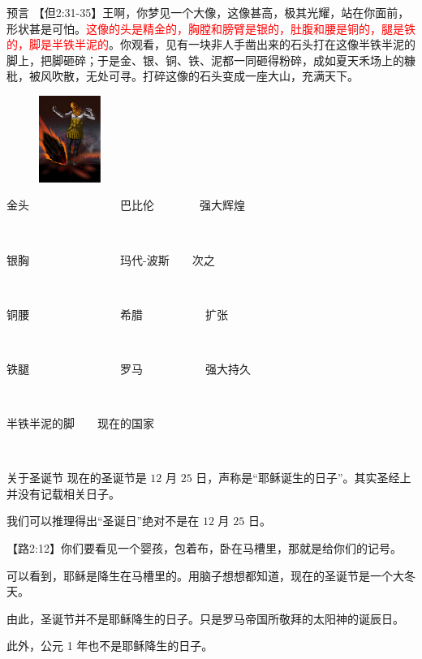 \documentclass[UTF8]{ctexbeamer}
\begin{document}
	\begin{frame}{预言}
		【但2:31-35】王啊，你梦见一个大像，这像甚高，极其光耀，站在你面前，形状甚是可怕。\textcolor{red}{这像的头是精金的，胸膛和膀臂是银的，肚腹和腰是铜的，腿是铁的，脚是半铁半泥的}。你观看，见有一块非人手凿出来的石头打在这像半铁半泥的脚上，把脚砸碎；于是金、银、铜、铁、泥都一同砸得粉碎，成如夏天禾场上的糠秕，被风吹散，无处可寻。打碎这像的石头变成一座大山，充满天下。
		\pause
		\begin{figure}
			\includegraphics[width=2cm]{picture/6.png}
		\end{figure}
		\pause
		金头~~~~~~~~~~~~~~~~巴比伦~~~~~~~~强大辉煌\par
		~\par
		\pause
		银胸~~~~~~~~~~~~~~~~玛代-波斯~~~~次之\par
		~\par
		\pause
		铜腰~~~~~~~~~~~~~~~~希腊~~~~~~~~~~~扩张\par
		~\par
		\pause
		铁腿~~~~~~~~~~~~~~~~罗马~~~~~~~~~~~强大持久\par
		~\par
		\pause
		半铁半泥的脚~~~~现在的国家\par 
		~\par
	\end{frame}
	\begin{frame}{关于圣诞节}
		现在的圣诞节是 $12$ 月 $25$ 日，声称是“耶稣诞生的日子”。其实圣经上并没有记载相关日子。\par\pause
		我们可以推理得出“圣诞日”绝对不是在 $12$ 月 $25$ 日。\par\pause
		【路2:12】你们要看见一个婴孩，包着布，卧在马槽里，那就是给你们的记号。\par\pause
		可以看到，耶稣是降生在马槽里的。\pause 用脑子想想都知道，现在的圣诞节是一个大冬天。\par\pause
		由此，圣诞节并不是耶稣降生的日子。只是罗马帝国所敬拜的太阳神的诞辰日。\par\pause
		此外，公元 1 年也不是耶稣降生的日子。\par
	\end{frame}
	
	
	
	
\end{document}
